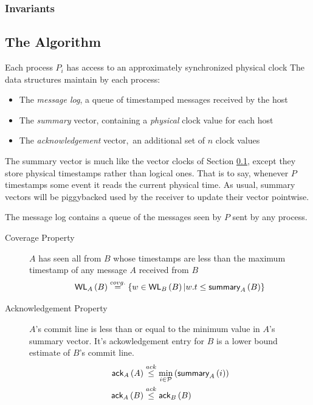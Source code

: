 \documentclass[]             %
{NASA}                       %
\theoremstyle{definition}
\begin{document}
\subsubsection{Invariants}

\subsection{The Algorithm}

Each process $P_i$ has access to an approximately synchronized physical clock
The data structures maintain by each process:

\begin{itemize}
\item The \emph{message log}, a queue of timestamped messages received by the host
\item The \emph{summary} vector, containing a \emph{physical} clock value for each host
\item The \emph{acknowledgement} vector,\ an additional set of $n$ clock values
\end{itemize}

The summary vector is much like the vector clocks of Section \ref{},
except they store physical timestamps rather than logical ones. That
is to say, whenever $P$ timestamps some event it reads the current
physical time. As usual, summary vectors will be piggybacked used by
the receiver to update their vector pointwise.

The message log contains a queue of the messages seen by $P$ sent by
any process.



\begin{description}
\item[Coverage Property] $A$ has seen all from $B$ whose timestamps are less
  than the maximum timestamp of any message $A$ received from $B$
  \[ \textsf{WL}_{A}\left(B\right) \overset{covg.}{=} \{w \in \textsf{WL}_{B}\left(B\right) | w.t \leq \textsf{summary}_{A}\left(B\right) \} \]
\item[Acknowledgement Property] $A$'s commit line is less than or equal to the minimum value in $A$'s summary vector. It's ackowledgement entry for $B$ is a lower bound estimate of $B$'s commit line.
  \begin{align*}
    \textsf{ack}_{A}\left(A\right) &\overset{ack}{\leq} \min_{i \in \mathcal{P}} \left(\textsf{summary}_{A}\left(i\right)\right) \\
    \textsf{ack}_{A}\left(B\right) &\overset{ack}{\leq} \textsf{ack}_{B}\left(B\right)
  \end{align*}
\end{description}
\end{document}
